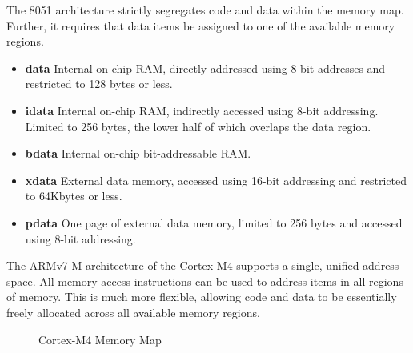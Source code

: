 \documentclass{article}
\begin{document}
The 8051 architecture strictly segregates code and data within the memory map. Further,
it requires that data items be assigned to one of the available memory regions.
\begin{itemize}
  \item \textbf{data} Internal on-chip RAM, directly addressed using 8-bit addresses and
  restricted to 128 bytes or less.
  \item \textbf{idata} Internal on-chip RAM, indirectly accessed using 8-bit addressing. Limited
  to 256 bytes, the lower half of which overlaps the data region.
  \item \textbf{bdata} Internal on-chip bit-addressable RAM.
  \item \textbf{xdata} External data memory, accessed using 16-bit addressing and restricted to
  64Kbytes or less.
  \item \textbf{pdata} One page of external data memory, limited to 256 bytes and accessed
  using 8-bit addressing.
\end{itemize}


The ARMv7-M architecture of the Cortex-M4 supports a single, unified address space. All
memory access instructions can be used to address items in all regions of memory. This
is much more flexible, allowing code and data to be essentially freely allocated across all
available memory regions. 

\begin{figure}[H]
  \caption{Cortex-M4 Memory Map}
  \label{block-diag}
\end{figure}
\end{document}
